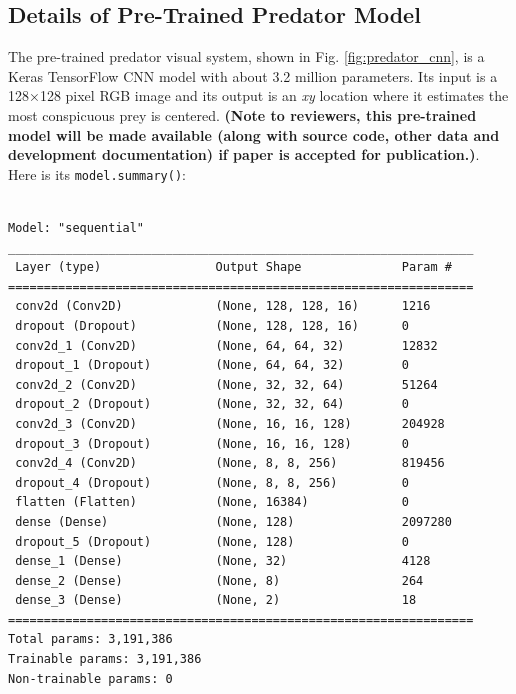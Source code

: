 \documentclass[acmtog,
    anonymous,
    review
    ]{acmart}
\begin{document}
\subsection{Details of Pre-Trained Predator Model}
\begin{minipage}{\linewidth}
The pre-trained predator visual system, shown in Fig. \ref{fig:predator_cnn}, is a Keras TensorFlow CNN model with about 3.2 million parameters. Its input is a 128×128 pixel RGB image and its output is an \textit{xy} location where it estimates the most conspicuous prey is centered. \textbf{(Note to reviewers, this pre-trained model will be made available (along with source code, other data and development documentation) if paper is accepted for publication.)}. Here is its \texttt{model.summary()}:
\par
\hspace*{1cm}
\begin{minipage}{\linewidth-1.1cm}
\begin{small}
\begin{verbatim}

Model: "sequential"
_________________________________________________________________
 Layer (type)                Output Shape              Param #
=================================================================
 conv2d (Conv2D)             (None, 128, 128, 16)      1216
 dropout (Dropout)           (None, 128, 128, 16)      0
 conv2d_1 (Conv2D)           (None, 64, 64, 32)        12832
 dropout_1 (Dropout)         (None, 64, 64, 32)        0
 conv2d_2 (Conv2D)           (None, 32, 32, 64)        51264
 dropout_2 (Dropout)         (None, 32, 32, 64)        0
 conv2d_3 (Conv2D)           (None, 16, 16, 128)       204928
 dropout_3 (Dropout)         (None, 16, 16, 128)       0
 conv2d_4 (Conv2D)           (None, 8, 8, 256)         819456
 dropout_4 (Dropout)         (None, 8, 8, 256)         0
 flatten (Flatten)           (None, 16384)             0
 dense (Dense)               (None, 128)               2097280
 dropout_5 (Dropout)         (None, 128)               0
 dense_1 (Dense)             (None, 32)                4128
 dense_2 (Dense)             (None, 8)                 264
 dense_3 (Dense)             (None, 2)                 18
=================================================================
Total params: 3,191,386
Trainable params: 3,191,386
Non-trainable params: 0
\end{verbatim}
\end{small}
\end{minipage}
\end{minipage}
\par
\end{document}
